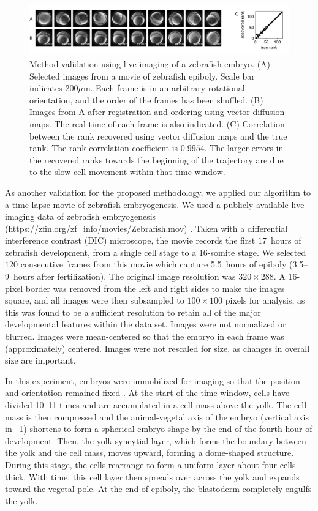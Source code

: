 \begin{figure}[t]
\includegraphics[width=\textwidth]{fig4}
\caption[Method validation using live imaging of a zebrafish embryo]{Method validation using live imaging of a zebrafish embryo. (A) Selected images from a movie of zebrafish epiboly. Scale bar indicates 200$\mu$m. Each frame is in an arbitrary rotational orientation, and the order of the frames has been shuffled. (B) Images from A after registration and ordering using vector diffusion maps. The real time of each frame is also indicated. (C) Correlation between the rank recovered using vector diffusion maps and the true rank.  The rank correlation coefficient is $0.9954$. The larger errors in the recovered ranks towards the beginning of the trajectory are due to the slow cell movement within that time window. }
\label{fig:zebrafish}
\end{figure}

As another validation for the proposed methodology, we applied our algorithm to a time-lapse movie  of zebrafish embryogenesis.
%
We used a publicly available live imaging data of zebrafish embryogenesis (\url{https://zfin.org/zf\_info/movies/Zebrafish.mov}) \cite{karlstrom1996flipbook}.
%
Taken with a differential interference contrast (DIC) microscope, the movie records the first $17$~hours of zebrafish development, from a single cell stage to a 16-somite stage.
%
We selected $120$ consecutive frames from this movie which capture 5.5~hours of epiboly (3.5--9~hours after fertilization).
%
The original image resolution was $320 \times 288$.
%
A $16$-pixel border was removed from the left and right sides to make the images square, and all images were then subsampled to $100 \times 100$ pixels for analysis, as this was found to be a sufficient resolution to retain all of the major developmental features within the data set. 
%
Images were not normalized or blurred.
%
Images were mean-centered so that the embryo in each frame was (approximately) centered. 
%
Images were not rescaled for size, as changes in overall size are important. 

In this experiment, embryos were immobilized for imaging so that the position and orientation remained fixed \citep{kane1996zebrafish}.
%
At the start of the time window, cells have divided 10--11 times and are accumulated in a cell mass above the yolk.
%
The cell mass is then compressed and the animal-vegetal axis of the embryo (vertical axis in \fig~\ref{fig:zebrafish}) shortens to form a spherical embryo shape by the end of the fourth hour of development.
%
Then, the yolk syncytial layer, which forms the boundary between the yolk and the cell mass, moves upward, forming a dome-shaped structure.
%
During this stage, the cells rearrange to form a uniform layer about four cells thick.
%
With time, this cell layer then spreads over across the yolk and expands toward the vegetal pole.
%
At the end of epiboly, the blastoderm completely engulfs the yolk.

